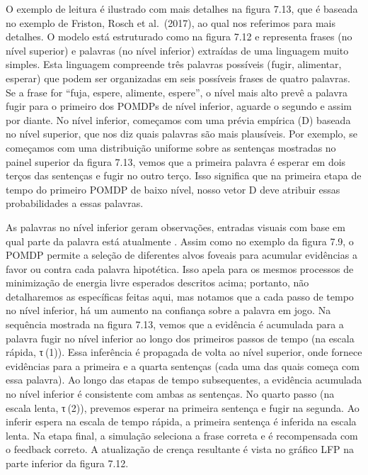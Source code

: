 \documentclass[
  12pt,
]{book}
\begin{document}
O exemplo de leitura é ilustrado com mais detalhes na figura 7.13, que é baseada no exemplo de Friston, Rosch et al.~(2017), ao qual nos referimos para mais detalhes. O modelo está estruturado como na figura 7.12 e representa frases (no nível superior) e palavras (no nível inferior) extraídas de uma linguagem muito simples. Esta linguagem compreende três palavras possíveis ( fugir, alimentar, esperar) que podem ser organizadas em seis possíveis frases de quatro palavras. Se a frase for ``fuja, espere, alimente, espere'', o nível mais alto prevê a palavra fugir para o primeiro dos POMDPs de nível inferior, aguarde o segundo e assim por diante. No nível inferior, começamos com uma prévia empírica (D) baseada no nível superior, que nos diz quais palavras são mais plausíveis. Por exemplo, se começamos com uma distribuição uniforme sobre as sentenças mostradas no painel superior da figura 7.13, vemos que a primeira palavra é esperar em dois terços das sentenças e fugir no outro terço. Isso significa que na primeira etapa de tempo do primeiro POMDP de baixo nível, nosso vetor D deve atribuir essas probabilidades a essas palavras.

As palavras no nível inferior geram observações, entradas visuais com base em qual parte da palavra está atualmente . Assim como no exemplo da figura 7.9, o POMDP permite a seleção de diferentes alvos foveais para acumular evidências a favor ou contra cada palavra hipotética. Isso apela para os mesmos processos de minimização de energia livre esperados descritos acima; portanto, não detalharemos as específicas feitas aqui, mas notamos que a cada passo de tempo no nível inferior, há um aumento na confiança sobre a palavra em jogo. Na sequência mostrada na figura 7.13, vemos que a evidência é acumulada para a palavra fugir no nível inferior ao longo dos primeiros passos de tempo (na escala rápida, τ (1)). Essa inferência é propagada de volta ao nível superior, onde fornece evidências para a primeira e a quarta sentenças (cada uma das quais começa com essa palavra). Ao longo das etapas de tempo subsequentes, a evidência acumulada no nível inferior é consistente com ambas as sentenças. No quarto passo (na escala lenta, τ (2)), prevemos esperar na primeira sentença e fugir na segunda. Ao inferir espera na escala de tempo rápida, a primeira sentença é inferida na escala lenta. Na etapa final, a simulação seleciona a frase correta e é recompensada com o feedback correto. A atualização de crença resultante é vista no gráfico LFP na parte inferior da figura 7.12.
\end{document}
